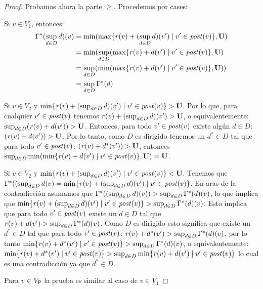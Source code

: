 \begin{proof}
    Probamos ahora la parte $\geq$.   Procedemos por cases:
    
    Si   $v \in V_1$,  entonces:
     \begin{align}
     \Gamma^* (\sup_{d \in D} d)(v) & = \min ( \max \{ \mathit{r}(v) + (\sup_{d \in D} d)(v') \mid v' \in \mathit{post}(v)\},  \mathbf{U} ) \\                                                                                       
                                                     & =\min(  \sup_{d \in D} ( \max \{\mathit{r}(v) + d(v') \mid v' \in \mathit{post}(v) \}, \mathbf{U} ) \\
                                                     & = \sup_{d \in D} (\min( \max \{ \mathit{r}(v) + d(v') \mid v' \in \mathit{post}(v) \}, \mathbf{U})) \\
                                                     & =  \sup_{d \in D} \Gamma^*(d)
    \end{align}
    
    Si $v \in V_2$  y $\min \{ \mathit{r}(v) + (\sup_{d \in D} d)(v') \mid v' \in \mathit{post}(v)\} > \mathbf{U}$. Por lo que, para
    cualquier $v' \in \mathit{post}(v)$ tenemos  $\mathit{r}(v) + (\sup_{d \in D} d)(v') > \mathbf{U}$, o equivalentemente: 
    $\sup_{d \in D} (\mathit{r}(v) + d(v')) > \mathbf{U}$. Entonces, para todo $v' \in \mathit{post}(v)$ existe algún $d \in D$: $(\mathit{r}(v) + d(v')) > \mathbf{U}$.
    Por lo tanto, como $D$ es dirigido tenemos un $d^* \in D$ tal que para todo $v' \in \mathit{post}(v)$: $(\mathit{r}(v) + d^*(v')) > \mathbf{U}$, entonces 
    $\sup_{d \in D} \min ( \min \{ \mathit{r}(v) + d(v') \mid v' \in \mathit{post}(v)\}, \mathbf{U}) = \mathbf{U}$.
     
     Si $v \in V_2$  y $\min \{ \mathit{r}(v) + (\sup_{d \in D} d)(v') \mid v' \in \mathit{post}(v)\} < \mathbf{U}$.  Tenemos que
     $\Gamma^*((\sup_{d \in D} d) v) = \min \{ \mathit{r}(v) + (\sup_{d \in D} d)(v') \mid v' \in \mathit{post}(v)\}$. En aras de la contradicción asumamos que $\Gamma^*((\sup_{d \in D} d)(v)) > \sup_{d \in D} \Gamma^*(d)(v)$, lo que implica que
    $\min \{ \mathit{r}(v) + (\sup_{d \in D} d)(v') \mid v' \in \mathit{post}(v)\} > \sup_{d \in D} \Gamma^*(d)(v)$. Esto implica
    que para todo $v' \in \mathit{post}(v)$ existe un $d \in D$ tal que  $\mathit{r}(v) + d(v')  > \sup_{d \in D} \Gamma^*(d)(v)$.
    Como $D$ es dirigido esto significa que existe un $d^* \in D$ tal que para todo $v' \in \mathit{post}(v)$: $\mathit{r}(v) + d^*(v')  > \sup_{d \in D} \Gamma^*(d)(v)$,
    por lo tanto $\min \{ \mathit{r}(v) + d^*(v') \mid v' \in \mathit{post}(v)  \} > \sup_{d \in D} \Gamma^*(d)(v)$, o equivalentemente:
    $\min \{ \mathit{r}(v) + d^*(v') \mid v' \in \mathit{post}(v)  \} > \sup_{d \in D} \min \{ \mathit{r}(v) + d(v') \mid v' \in \mathit{post}(v)\}$ lo cual es una contradicción ya que $d^* \in D$.
     
    Para $v \in V_{\mathsf{P}}$ la prueba es similar al caso de $v \in V_1$
    

\end{proof}
